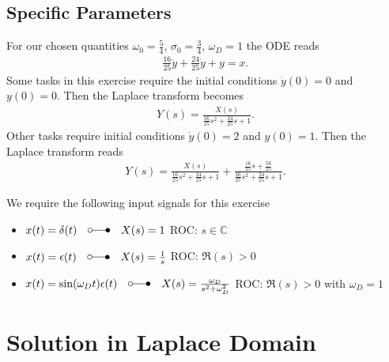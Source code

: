 \documentclass[a4paper,11pt,oneside]{scrartcl}
\begin{document}
\subsection{Specific Parameters}
For our chosen quantities
$\omega_0=\frac{5}{4}$,
$\sigma_0 = \frac{3}{4}$,
$\omega_D=1$
the ODE reads
\begin{align}
\frac{16}{25} \ddot{y} + \frac{24}{25} \dot{y} + y = x.
\end{align}
Some tasks in this exercise require the initial conditions
$\dot{y}(0)=0$ and $y(0)=0$.
Then the Laplace transform becomes
\begin{align}
Y(s) = \frac{X(s)}{\frac{16}{25} s^2 + \frac{24}{25} s + 1}.
\end{align}
Other tasks require initial conditions $\dot{y}(0)=2$ and $y(0)=1$.
Then the Laplace transform reads
\begin{align}
Y(s) = \frac{X(s)}{\frac{16}{25} s^2 + \frac{24}{25} s + 1}+
\frac{\frac{16}{25} s + \frac{56}{25}}{\frac{16}{25} s^2 + \frac{24}{25} s + 1}.
\end{align}

We require the following input signals for this exercise
\begin{itemize}
  \item $x(t) = \delta(t) \quad \laplace \quad X(s) = 1$
  \quad ROC: $s \in \mathbb{C}$
  \item $x(t) = \epsilon(t) \quad \laplace \quad X(s) = \frac{1}{s}$
  \quad ROC: $\Re(s)>0$
  \item $x(t) =  \sin(\omega_D t) \epsilon(t) \quad \laplace \quad
   X(s) = \frac{\omega_D}{s^2 + \omega_D^2}$
   \quad ROC: $\Re(s)>0$ with $\omega_D=1$
\end{itemize}


\section{Solution in Laplace Domain}

\end{document}
